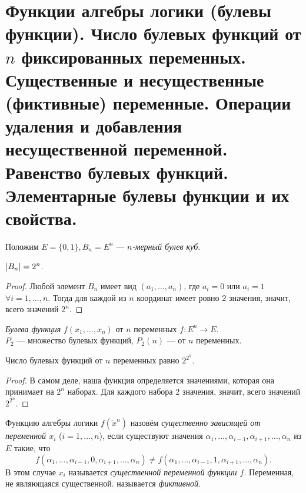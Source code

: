 \section{Функции алгебры логики (булевы функции). Число булевых функций от $n$ фиксированных переменных. Существенные и несущественные (фиктивные) переменные. Операции удаления и добавления несущественной переменной. Равенство булевых функций. Элементарные булевы функции и их свойства.}

Положим $E=\{0, 1\}, B_n = E^n$ --- \textit{$n$-мерный булев куб}.

\begin{proposal}
    $\left\lvert B_n\right\rvert = 2^n$.
\end{proposal}

\begin{proof}
    Любой элемент $B_n$ имеет вид $(a_1, \ldots, a_n)$, где $a_i = 0$ или $a_i = 1$ $\forall i = 1, \ldots, n$. Тогда для каждой из $n$ координат имеет ровно $2$ значения, значит, всего значений $2^n$.
\end{proof}

\begin{definition}
    \textit{Булева функция} $f(x_1, \ldots, x_n)$ от $n$ переменных $f: E^n \to E$.\\
    $P_2$ --- множество булевых функций, $P_2(n)$ --- от $n$ переменных.
\end{definition}

\begin{theorem}
    Число булевых функций от $n$ переменных равно $2^{2^n}$.
\end{theorem}

\begin{proof}
    В самом деле, наша функция определяется значениями, которая она принимает на $2^n$ наборах. Для каждого набора 2 значения, значит, всего значений $2^{2^n}$.
\end{proof}

\begin{definition}
    Функцию алгебры логики $f(\widetilde{x}^n)$ назовём \textit{существенно зависящей от переменной $x_i$} ($i = 1, \ldots, n$), если существуют значения $\alpha_1, \ldots, \alpha_{i - 1}, \alpha_{i + 1}, \ldots, \alpha_n$ из $E$ такие, что \[f(\alpha_1, \ldots, \alpha_{i - 1}, 0, \alpha_{i + 1}, \ldots, \alpha_n) \ne f(\alpha_1, \ldots, \alpha_{i - 1}, 1, \alpha_{i + 1}, \ldots, \alpha_n).\]
    В этом случае $x_i$ называется \textit{существенной переменной функции $f$}. Переменная, не являющаяся существенной. называется \textit{фиктивной}.
\end{definition}

